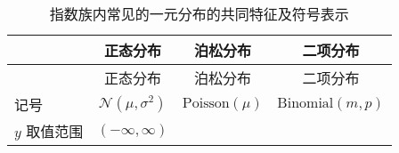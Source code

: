 \documentclass[12pt,a4paper,UTF8,twoside]{book}
\theoremstyle{definition}
\theoremstyle{definition}
\theoremstyle{definition}
\theoremstyle{remark}
\begin{document}
\begin{longtable}[]{@{}lccc@{}}
\caption{\label{tab:common-characteristics} 指数族内常见的一元分布的共同特征及符号表示}\tabularnewline
\toprule
\begin{minipage}[b]{0.21\columnwidth}\raggedright
\strut
\end{minipage} & \begin{minipage}[b]{0.22\columnwidth}\centering
正态分布\strut
\end{minipage} & \begin{minipage}[b]{0.22\columnwidth}\centering
泊松分布\strut
\end{minipage} & \begin{minipage}[b]{0.22\columnwidth}\centering
二项分布\strut
\end{minipage}\tabularnewline
\midrule
\endfirsthead
\toprule
\begin{minipage}[b]{0.21\columnwidth}\raggedright
\strut
\end{minipage} & \begin{minipage}[b]{0.22\columnwidth}\centering
正态分布\strut
\end{minipage} & \begin{minipage}[b]{0.22\columnwidth}\centering
泊松分布\strut
\end{minipage} & \begin{minipage}[b]{0.22\columnwidth}\centering
二项分布\strut
\end{minipage}\tabularnewline
\midrule
\endhead
\begin{minipage}[t]{0.21\columnwidth}\raggedright
记号\strut
\end{minipage} & \begin{minipage}[t]{0.22\columnwidth}\centering
\(\mathcal{N}(\mu,\sigma^2)\)\strut
\end{minipage} & \begin{minipage}[t]{0.22\columnwidth}\centering
\(\mathrm{Poisson}(\mu)\)\strut
\end{minipage} & \begin{minipage}[t]{0.22\columnwidth}\centering
\(\mathrm{Binomial}(m,p)\)\strut
\end{minipage}\tabularnewline
\begin{minipage}[t]{0.21\columnwidth}\raggedright
\(y\) 取值范围\strut
\end{minipage} & \begin{minipage}[t]{0.22\columnwidth}\centering
\((-\infty,\infty)\)\strut
\end{minipage} & \begin{minipage}[t]{0.22\columnwidth}\centering

\end{minipage}
\end{longtable}
\end{document}
